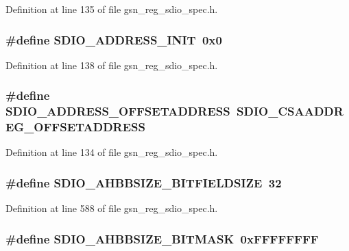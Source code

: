 Definition at line 135 of file gsn\_\-reg\_\-sdio\_\-spec.h.

\hypertarget{a00571_a96305c0913012e919e11622cb57f11b4}{
\subsubsection[{SDIO\_\-ADDRESS\_\-INIT}]{\setlength{\rightskip}{0pt plus 5cm}\#define SDIO\_\-ADDRESS\_\-INIT~0x0}}
\label{a00571_a96305c0913012e919e11622cb57f11b4}


Definition at line 138 of file gsn\_\-reg\_\-sdio\_\-spec.h.

\hypertarget{a00571_a00e56301ccff5f6cbb3bff537665cbe1}{
\subsubsection[{SDIO\_\-ADDRESS\_\-OFFSETADDRESS}]{\setlength{\rightskip}{0pt plus 5cm}\#define SDIO\_\-ADDRESS\_\-OFFSETADDRESS~SDIO\_\-CSAADDREG\_\-OFFSETADDRESS}}
\label{a00571_a00e56301ccff5f6cbb3bff537665cbe1}


Definition at line 134 of file gsn\_\-reg\_\-sdio\_\-spec.h.

\hypertarget{a00571_a6e22abcd871451e7d3a627abd59cb018}{
\subsubsection[{SDIO\_\-AHBBSIZE\_\-BITFIELDSIZE}]{\setlength{\rightskip}{0pt plus 5cm}\#define SDIO\_\-AHBBSIZE\_\-BITFIELDSIZE~32}}
\label{a00571_a6e22abcd871451e7d3a627abd59cb018}


Definition at line 588 of file gsn\_\-reg\_\-sdio\_\-spec.h.

\hypertarget{a00571_acc8194620aef41b403af5d6efd45866a}{
\subsubsection[{SDIO\_\-AHBBSIZE\_\-BITMASK}]{\setlength{\rightskip}{0pt plus 5cm}\#define SDIO\_\-AHBBSIZE\_\-BITMASK~0xFFFFFFFF}}
\label{a00571_acc8194620aef41b403af5d6efd45866a}


